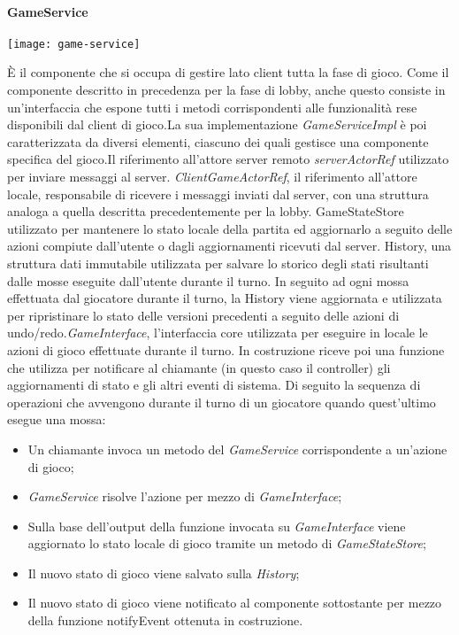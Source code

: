 \paragraph{GameService}
\begin{center}
    \texttt{[image: game-service]}
\end{center}
È il componente che si occupa di gestire lato client tutta la fase di gioco.
Come il componente descritto in precedenza per la fase di lobby, anche questo consiste in un’interfaccia che espone tutti i metodi corrispondenti alle funzionalità rese disponibili dal client di gioco.\newline La sua implementazione \textit{GameServiceImpl} è poi caratterizzata da diversi elementi, ciascuno dei quali gestisce una componente specifica del gioco.\newline Il riferimento all’attore server remoto \textit{serverActorRef} utilizzato per inviare messaggi al server. \textit{ClientGameActorRef}, il riferimento all’attore locale, responsabile di ricevere i messaggi inviati dal server, con una struttura analoga a quella descritta precedentemente per la lobby.
\newline GameStateStore utilizzato per mantenere lo stato locale della partita ed aggiornarlo a seguito delle azioni compiute dall’utente o dagli aggiornamenti ricevuti dal server. History, una struttura dati immutabile utilizzata per salvare lo storico degli stati risultanti dalle mosse eseguite dall’utente durante il turno. In seguito ad ogni mossa effettuata dal giocatore durante il turno, la History viene aggiornata e utilizzata per ripristinare lo stato delle versioni precedenti a seguito delle azioni di undo/redo.\newline \textit{GameInterface}, l’interfaccia core utilizzata per eseguire in locale le azioni di gioco effettuate durante il turno. \newline In costruzione riceve poi una funzione che utilizza per notificare al chiamante (in questo caso il controller) gli aggiornamenti di stato e gli altri eventi di sistema.
\newline
\newline
Di seguito la sequenza di operazioni che avvengono durante il turno di un giocatore quando quest’ultimo esegue una mossa:
\begin{itemize}
    \item Un chiamante invoca un metodo del \textit{GameService} corrispondente a un’azione di gioco;
    \item \textit{GameService} risolve l’azione per mezzo di \textit{GameInterface};
    \item Sulla base dell’output della funzione invocata su \textit{GameInterface} viene aggiornato lo stato locale di gioco tramite un metodo di \textit{GameStateStore};
    \item Il nuovo stato di gioco viene salvato sulla \textit{History};
    \item Il nuovo stato di gioco viene notificato al componente sottostante per mezzo della funzione notifyEvent ottenuta in costruzione.
\end{itemize}
